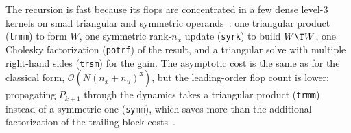 The recursion is fast because its flops are concentrated in a few dense level-3
kernels on small triangular and symmetric operands~\cite{frison2018blasfeo}: one triangular product
(\texttt{trmm}) to form $W$, one symmetric rank-$n_x$ update (\texttt{syrk}) to
build $W\T W$, one Cholesky factorization (\texttt{potrf}) of the result, and a
triangular solve with multiple right-hand sides (\texttt{trsm}) for the gain.
The asymptotic cost is the same as for the classical form,
$\mathcal{O}\!\left(N (n_x + n_u)^3\right)$, but the leading-order flop count is
lower: propagating $P_{k+1}$ through the dynamics takes a triangular product
(\texttt{trmm}) instead of a symmetric one (\texttt{symm}), which saves more than
the additional factorization of the trailing block costs~\cite{frison2013efficient}.

\newpage
\clearpage